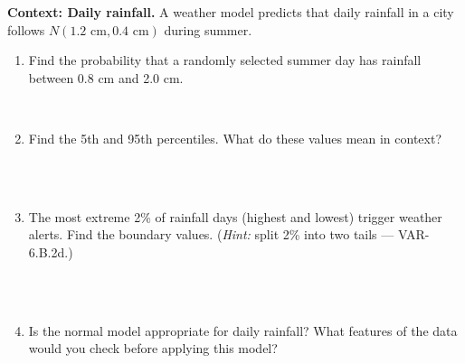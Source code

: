 \documentclass[10pt]{article}
\begin{document}
\vspace{0.1in}

\begin{tcolorbox}[colback=redbg, colframe=black!40, boxrule=0.6pt, arc=2mm,
    left=3mm, right=3mm, top=2mm, bottom=2mm, title=\textbf{Tier E --- Extension}]
\textbf{Context: Daily rainfall.} A weather model predicts that daily rainfall in a
city follows $N(1.2\text{ cm}, 0.4\text{ cm})$ during summer.

\begin{enumerate}
  \item Find the probability that a randomly selected summer day has rainfall between
        0.8 cm and 2.0 cm.
        \par\vspace{-\parskip}\nointerlineskip\noindent\begin{minipage}[t][0.9in][t]{\linewidth}\vspace*{2pt}\\
        \end{minipage}
  \item Find the 5th and 95th percentiles. What do these values mean in context?
        \par\vspace{-\parskip}\nointerlineskip\noindent\begin{minipage}[t][0.9in][t]{\linewidth}\vspace*{2pt}\\
        \\
        \end{minipage}
  \item The most extreme 2\% of rainfall days (highest and lowest) trigger weather
        alerts. Find the boundary values. (\textit{Hint:} split 2\% into two tails ---
        VAR-6.B.2d.)
        \par\vspace{-\parskip}\nointerlineskip\noindent\begin{minipage}[t][0.9in][t]{\linewidth}\vspace*{2pt}\\
        \\
        \end{minipage}
  \item Is the normal model appropriate for daily rainfall? What features of the data
        would you check before applying this model?
        \ansline{}\\
        \\
\end{enumerate}
\end{tcolorbox}
\end{document}
